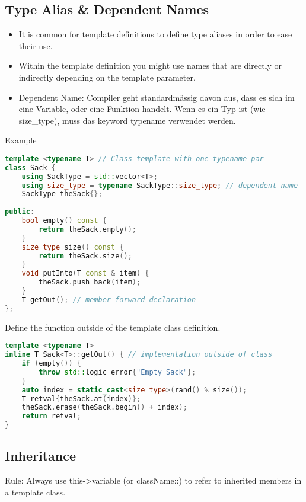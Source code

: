\subsection{Type Alias \& Dependent Names}
\begin{itemize}
  \itemsep -0.5em 
  \item It is common for template definitions to define type aliases in order to ease their use.
  \item Within the template definition you might use names that are directly or indirectly depending on the template parameter.
  \item Dependent Name: Compiler geht standardmässig davon aus, dass es sich im eine Variable, oder eine Funktion handelt. Wenn es ein Typ ist (wie size\_type), muss das keyword typename verwendet werden.
\end{itemize}

Example
\begin{lstlisting}[language=C++]
template <typename T> // Class template with one typename par
class Sack {
	using SackType = std::vector<T>;
	using size_type = typename SackType::size_type; // dependent name
	SackType theSack{};
	
public:
	bool empty() const {
		return theSack.empty();
	}
	size_type size() const {
		return theSack.size();
	}
	void putInto(T const & item) {
		theSack.push_back(item);
	}
	T getOut(); // member forward declaration
};
\end{lstlisting}
Define the function outside of the template class definition.
\begin{lstlisting}[language=C++]
template <typename T> 
inline T Sack<T>::getOut() { // implementation outside of class
	if (empty()) {
		throw std::logic_error{"Empty Sack"}; 
	} 
	auto index = static_cast<size_type>(rand() % size()); 
	T retval{theSack.at(index)};
	theSack.erase(theSack.begin() + index);
	return retval;
}
\end{lstlisting}

\subsection{Inheritance}
Rule: Always use this->variable (or className::) to refer to inherited members in a template class.

\pagebreak
